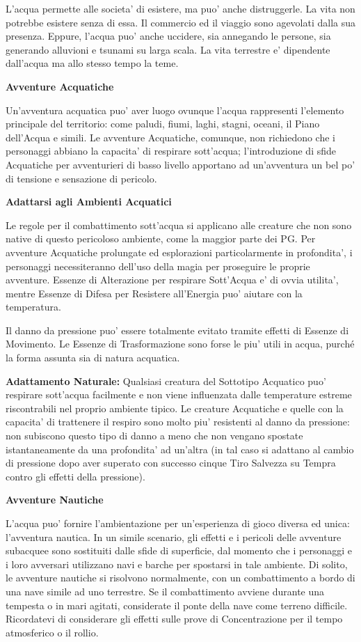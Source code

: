 \documentclass[a4paper,11pt,twoside,openany]{dndbook}
\begin{document}
{L'acqua permette alle societa' di esistere, ma puo' anche distruggerle. La vita non potrebbe esistere senza di essa. Il commercio ed il viaggio sono agevolati dalla sua presenza. Eppure, l'acqua puo' anche uccidere, sia annegando le persone, sia generando alluvioni e tsunami su larga scala. La vita terrestre e' dipendente dall'acqua ma allo stesso tempo la teme.

\textbf{Avventure Acquatiche}

Un'avventura acquatica puo' aver luogo ovunque l'acqua rappresenti l'elemento principale del territorio: come paludi, fiumi, laghi, stagni, oceani, il Piano dell'Acqua e simili. Le avventure Acquatiche, comunque, non richiedono che i personaggi abbiano la capacita' di respirare sott'acqua; l'introduzione di sfide Acquatiche per avventurieri di basso livello apportano ad un'avventura un bel po' di tensione e sensazione di pericolo.

\textbf{Adattarsi agli Ambienti Acquatici}

Le regole per il combattimento sott'acqua si applicano alle creature che non sono native di questo pericoloso ambiente, come la maggior parte dei PG. Per avventure Acquatiche prolungate ed esplorazioni particolarmente in profondita', i personaggi necessiteranno dell'uso della magia per proseguire le proprie avventure. Essenze di Alterazione per respirare Sott'Acqua e' di ovvia utilita', mentre Essenze di Difesa per Resistere all'Energia puo' aiutare con la temperatura.

Il danno da pressione puo' essere totalmente evitato tramite effetti di Essenze di Movimento. Le Essenze di Trasformazione sono forse le piu' utili in acqua, purché la forma assunta sia di natura acquatica.

\textbf{Adattamento Naturale:} Qualsiasi creatura del Sottotipo Acquatico puo' respirare sott'acqua facilmente e non viene influenzata dalle temperature estreme riscontrabili nel proprio ambiente tipico. Le creature Acquatiche e quelle con la capacita' di trattenere il respiro sono molto piu' resistenti al danno da pressione: non subiscono questo tipo di danno a meno che non vengano spostate istantaneamente da una profondita' ad un'altra (in tal caso si adattano al cambio di pressione dopo aver superato con successo cinque Tiro Salvezza su Tempra contro gli effetti della pressione).

\textbf{Avventure Nautiche}

L'acqua puo' fornire l'ambientazione per un'esperienza di gioco diversa ed unica: l'avventura nautica. In un simile scenario, gli effetti e i pericoli delle avventure subacquee sono sostituiti dalle sfide di superficie, dal momento che i personaggi e i loro avversari utilizzano navi e barche per spostarsi in tale ambiente. Di solito, le avventure nautiche si risolvono normalmente, con un combattimento a bordo di una nave simile ad uno terrestre. Se il combattimento avviene durante una tempesta o in mari agitati, considerate il ponte della nave come terreno difficile. Ricordatevi di considerare gli effetti sulle prove di Concentrazione per il tempo atmosferico o il rollio.

}
\end{document}
